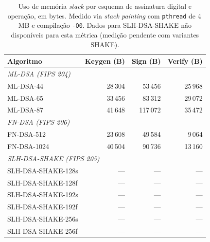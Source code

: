\begin{table}[ht]
\centering
\caption{Uso de memória \textit{stack} por esquema de assinatura digital
e operação, em bytes. Medido via \textit{stack painting}
com \texttt{pthread} de 4\,MB e compilação \texttt{-O0}.
Dados para SLH-DSA-SHAKE não disponíveis para esta métrica
(medição pendente com variantes SHAKE).}
\label{tab:stack_sig}
\begin{tabular}{lrrr}
\toprule
\textbf{Algoritmo} & \textbf{Keygen (B)} & \textbf{Sign (B)} & \textbf{Verify (B)} \\
\midrule
\multicolumn{4}{l}{\textit{ML-DSA (FIPS 204)}} \\[2pt]
\quad ML-DSA-44 &  28\,304 &  53\,456 &  25\,968 \\
\quad ML-DSA-65 &  33\,456 &  83\,312 &  29\,072 \\
\quad ML-DSA-87 &  41\,648 & 117\,072 &  35\,472 \\
\midrule
\multicolumn{4}{l}{\textit{FN-DSA (FIPS 206)}} \\[2pt]
\quad FN-DSA-512  &  23\,608 &  49\,584 &   9\,064 \\
\quad FN-DSA-1024 &  40\,504 &  90\,736 &  13\,160 \\
\midrule
\multicolumn{4}{l}{\textit{SLH-DSA-SHAKE (FIPS 205)}} \\[2pt]
\quad SLH-DSA-SHAKE-128s & --- & --- & --- \\
\quad SLH-DSA-SHAKE-128f & --- & --- & --- \\
\quad SLH-DSA-SHAKE-192s & --- & --- & --- \\
\quad SLH-DSA-SHAKE-192f & --- & --- & --- \\
\quad SLH-DSA-SHAKE-256s & --- & --- & --- \\
\quad SLH-DSA-SHAKE-256f & --- & --- & --- \\
\bottomrule
\end{tabular}
\end{table}


